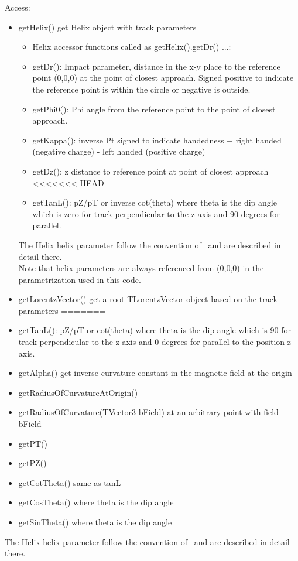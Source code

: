 \documentclass[aps,prd,superscriptaddress,floatfix]{revtex4}
\begin{document}
Access:
\begin{itemize}
\item getHelix() get Helix object with track parameters
\begin{itemize}
\item Helix accessor functions called as getHelix().getDr() ...:
\item getDr(): Impact parameter, distance in the x-y place to the reference point (0,0,0) at the point of closest
approach. Signed positive to indicate the reference point is within the circle or negative is outside.
\item getPhi0(): Phi angle from the reference point to the point of closest approach.
\item getKappa(): inverse Pt signed to indicate handedness + right handed (negative charge) - left handed
(positive charge)
\item getDz(): z distance to reference point at point of closest approach
<<<<<<< HEAD
\item getTanL(): pZ/pT or inverse cot(theta) where theta is the dip angle which is zero for track perpendicular
to the z axis and 90 degrees for parallel.
\end{itemize}
The Helix helix parameter follow the convention of~\cite{helix} and are described in detail there.\\
Note that helix parameters are always referenced from (0,0,0) in the parametrization used in this code.
\item getLorentzVector() get a root TLorentzVector object based on the track parameters
=======
\item getTanL(): pZ/pT or cot(theta) where theta is the dip angle which is 90 for track perpendicular
to the z axis and 0 degrees for parallel to the position z axis.
\item getAlpha() get inverse curvature constant in the magnetic field at the origin
\item getRadiusOfCurvatureAtOrigin()
\item getRadiusOfCurvature(TVector3 bField) at an arbitrary point with field bField
\item getPT()
\item getPZ()
\item getCotTheta() same as tanL
\item getCosTheta() where theta is the dip angle
\item getSinTheta() where theta is the dip angle 
\end{itemize}
The Helix helix parameter follow the convention of~\cite{helix} and are described in detail there.\\
\end{document}
